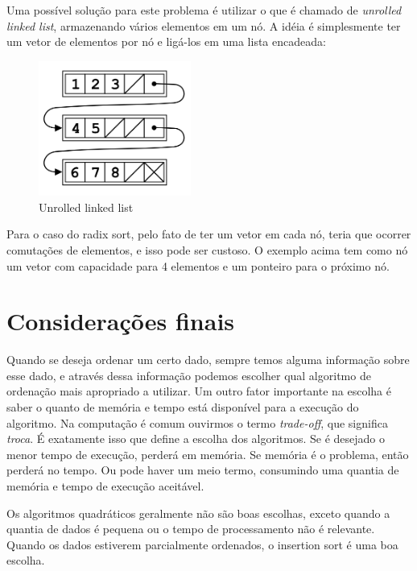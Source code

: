 \documentclass[fleqn,10pt]{SelfArx} %
\begin{document}
Uma possível solução para este problema é utilizar o que é chamado de \emph{unrolled linked list}, armazenando 
vários elementos em um nó. A idéia é simplesmente ter um vetor de elementos por nó e ligá-los em uma lista encadeada:

\begin{figure}[ht]\centering %
\includegraphics[width=50mm]{unrolled}
\caption{Unrolled linked list}
\label{fig:unrolled}
\end{figure}

Para o caso do radix sort, pelo fato de ter um vetor em cada nó, teria que ocorrer comutações de elementos, e isso pode 
ser custoso. O exemplo acima tem como nó um vetor com capacidade para 4 elementos e um ponteiro para o próximo nó.


\section{Considerações finais}

Quando se deseja ordenar um certo dado, sempre temos alguma informação sobre esse dado, e através dessa informação 
podemos escolher qual algoritmo de ordenação mais apropriado a utilizar. 
Um outro fator importante na escolha é saber o quanto de memória e tempo está disponível para a execução 
do algoritmo.
Na computação é comum ouvirmos o termo \emph{trade-off}, que significa \emph{troca}. É exatamente isso que define a 
escolha dos algoritmos. Se é desejado o menor tempo de execução, perderá em memória. Se memória é o problema, então 
perderá no tempo. Ou pode haver um meio termo, consumindo uma quantia de memória e tempo de execução aceitável.

Os algoritmos quadráticos geralmente não são boas escolhas, exceto quando a quantia de dados é pequena ou o tempo de 
processamento não é relevante. Quando os dados estiverem parcialmente ordenados, o insertion sort é uma boa escolha.
\end{document}

